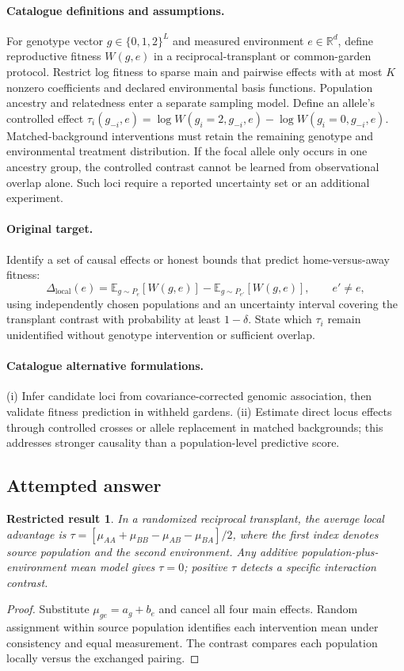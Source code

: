 \documentclass[11pt]{article}
\newcommand{\R}{\mathbb R}
\newcommand{\E}{\mathbb E}
\providecommand{\R}{\mathbb R}
\providecommand{\E}{\mathbb E}
\newtheorem{attemptresult}{Restricted result}[section]
\begin{document}
\paragraph{Catalogue definitions and assumptions.}
For genotype vector $g\in\{0,1,2\}^L$ and measured environment $e\in\R^d$, define reproductive fitness $W(g,e)$ in a reciprocal-transplant or common-garden protocol. Restrict log fitness to sparse main and pairwise effects with at most $K$ nonzero coefficients and declared environmental basis functions. Population ancestry and relatedness enter a separate sampling model. Define an allele's controlled effect $\tau_i(g_{-i},e)=\log W(g_i=2,g_{-i},e)-\log W(g_i=0,g_{-i},e)$. Matched-background interventions must retain the remaining genotype and environmental treatment distribution. If the focal allele only occurs in one ancestry group, the controlled contrast cannot be learned from observational overlap alone. Such loci require a reported uncertainty set or an additional experiment.
\paragraph{Original target.}
Identify a set of causal effects or honest bounds that predict home-versus-away fitness:
\[
 \Delta_{\mathrm{local}}(e)=
 \E_{g\sim P_e}[W(g,e)]-
 \E_{g\sim P_{e'}}[W(g,e)],\qquad e'\ne e,
\]
using independently chosen populations and an uncertainty interval covering the transplant contrast with probability at least $1-\delta$. State which $\tau_i$ remain unidentified without genotype intervention or sufficient overlap.
\paragraph{Catalogue alternative formulations.}
(i) Infer candidate loci from covariance-corrected genomic association, then validate fitness prediction in withheld gardens. (ii) Estimate direct locus effects through controlled crosses or allele replacement in matched backgrounds; this addresses stronger causality than a population-level predictive score.
\subsection{Attempted answer}
\begin{attemptresult}
In a randomized reciprocal transplant, the average local advantage is $\tau=[\mu_{AA}+\mu_{BB}-\mu_{AB}-\mu_{BA}]/2$, where the first index denotes source population and the second environment. Any additive population-plus-environment mean model gives $\tau=0$; positive $\tau$ detects a specific interaction contrast.
\end{attemptresult}
\begin{proof}
Substitute $\mu_{ge}=a_g+b_e$ and cancel all four main effects. Random assignment within source population identifies each intervention mean under consistency and equal measurement. The contrast compares each population locally versus the exchanged pairing.
\end{proof}
\end{document}
